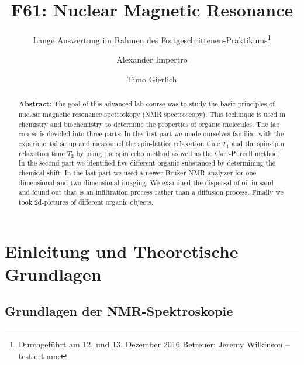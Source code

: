 \documentclass[a4paper]{scrartcl} %
\begin{document}
\author{Alexander Impertro \and Timo Gierlich}
\title{F61: Nuclear Magnetic Resonance}
\subtitle{Lange Auswertung im Rahmen des Fortgeschrittenen-Praktikums\footnote{Durchgeführt am 12. und 13. Dezember 2016 \newline Betreuer: Jeremy Wilkinson -- testiert am:}}
\maketitle




\begin{abstract}


	\textbf{Abstract:} The goal of this advanced lab course was to study the basic principles of nuclear magnetic resonance spetroskopy (NMR spectroscopy). This technique is used in chemistry and biochemistry to determine the properties of organic molecules. The lab course is devided into three parts: In the first part we made ourselves familiar with the experimental setup and meassured the spin-lattice relaxation time $T_1$ and the spin-spin relaxation time $T_2$ by using the spin echo method as well as the Carr-Purcell method. In the second part we identified five different organic substanced by determining the chemical  shift. In the last part we used a newer Bruker NMR analyzer for one dimensional and two dimensional imaging. We examined the dispersal of oil in sand and found out that is an infiltration process rather than a diffusion process. Finally we took 2d-pictures of different organic objects.
\end{abstract}

\newpage

\tableofcontents

\newpage

\section{Einleitung und Theoretische Grundlagen}

\subsection{Grundlagen der NMR-Spektroskopie}
\end{document}
